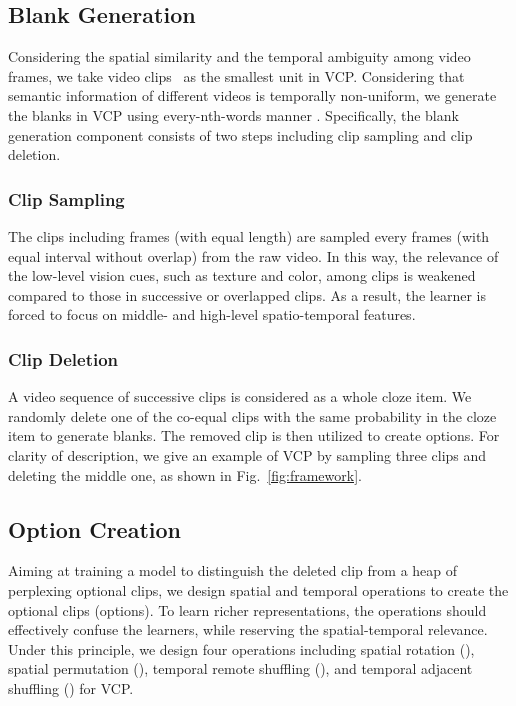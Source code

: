 \documentclass[letterpaper]{article}
\begin{document}
\subsection{Blank Generation} 
Considering the spatial similarity and the temporal ambiguity among video frames, we take video clips~\cite{xu2019self} as the smallest unit in VCP. Considering that semantic information of different videos is temporally non-uniform, we generate the blanks in VCP using every-nth-words manner \cite{bickley1970cloze}. Specifically, the blank generation component consists of two steps including clip sampling and clip deletion.


\subsubsection{Clip Sampling} The clips including  frames (with equal length) are sampled every  frames (with equal interval without overlap) from the raw video. In this way, the relevance of the low-level vision cues, such as texture and color, among clips is weakened compared to those in successive or overlapped clips. As a result, the learner is forced to focus on middle- and high-level spatio-temporal features. 

\subsubsection{Clip Deletion} A video sequence of  successive clips is considered as a whole cloze item. We randomly delete one of the co-equal clips with the same probability in the cloze item to generate blanks. The removed clip is then utilized to create options. For clarity of description, we give an example of VCP by sampling three clips and deleting the middle one, as shown in Fig.\ \ref{fig:framework}.


\subsection{Option Creation}
Aiming at training a model to distinguish the deleted clip from a heap of perplexing optional clips, we design spatial and temporal operations to create the optional clips (options). To learn richer representations, the operations should effectively confuse the learners, while reserving the spatial-temporal relevance. Under this principle, we design four operations including spatial rotation (), spatial permutation (), temporal remote shuffling (), and temporal adjacent shuffling () for VCP. 
\end{document}
